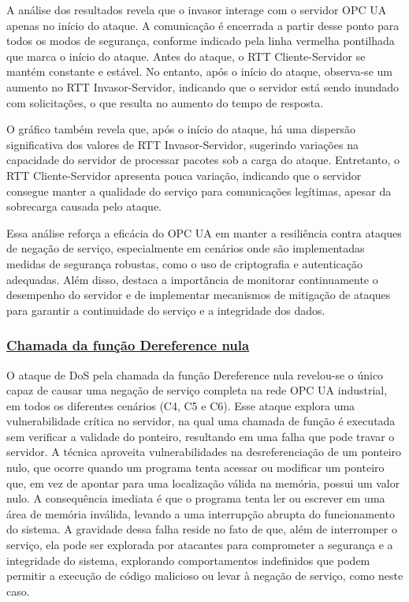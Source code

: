             A análise dos resultados revela que o invasor interage com o servidor OPC UA apenas no início do ataque. A comunicação é encerrada a partir desse ponto para todos os modos de segurança, conforme indicado pela linha vermelha pontilhada que marca o início do ataque. Antes do ataque, o RTT Cliente-Servidor se mantém constante e estável. No entanto, após o início do ataque, observa-se um aumento no RTT Invasor-Servidor, indicando que o servidor está sendo inundado com solicitações, o que resulta no aumento do tempo de resposta.

            O gráfico também revela que, após o início do ataque, há uma dispersão significativa dos valores de RTT Invasor-Servidor, sugerindo variações na capacidade do servidor de processar pacotes sob a carga do ataque. Entretanto, o RTT Cliente-Servidor apresenta pouca variação, indicando que o servidor consegue manter a qualidade do serviço para comunicações legítimas, apesar da sobrecarga causada pelo ataque.

            Essa análise reforça a eficácia do OPC UA em manter a resiliência contra ataques de negação de serviço, especialmente em cenários onde são implementadas medidas de segurança robustas, como o uso de criptografia e autenticação adequadas. Além disso, destaca a importância de monitorar continuamente o desempenho do servidor e de implementar mecanismos de mitigação de ataques para garantir a continuidade do serviço e a integridade dos dados.

        \subsubsection*{\underline{Chamada da função Dereference nula}}

            O ataque de DoS pela chamada da função Dereference nula revelou-se o único capaz de causar uma negação de serviço completa na rede OPC UA industrial, em todos os diferentes cenários (C4, C5 e C6). Esse ataque explora uma vulnerabilidade crítica no servidor, na qual uma chamada de função é executada sem verificar a validade do ponteiro, resultando em uma falha que pode travar o servidor. A técnica aproveita vulnerabilidades na desreferenciação de um ponteiro nulo, que ocorre quando um programa tenta acessar ou modificar um ponteiro que, em vez de apontar para uma localização válida na memória, possui um valor nulo. A consequência imediata é que o programa tenta ler ou escrever em uma área de memória inválida, levando a uma interrupção abrupta do funcionamento do sistema. A gravidade dessa falha reside no fato de que, além de interromper o serviço, ela pode ser explorada por atacantes para comprometer a segurança e a integridade do sistema, explorando comportamentos indefinidos que podem permitir a execução de código malicioso ou levar à negação de serviço, como neste caso.


